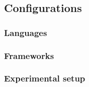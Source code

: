 
\subsection{Configurations}


\subsubsection{Languages}


\subsubsection{Frameworks}


\subsubsection{Experimental setup}


\pagebreak
